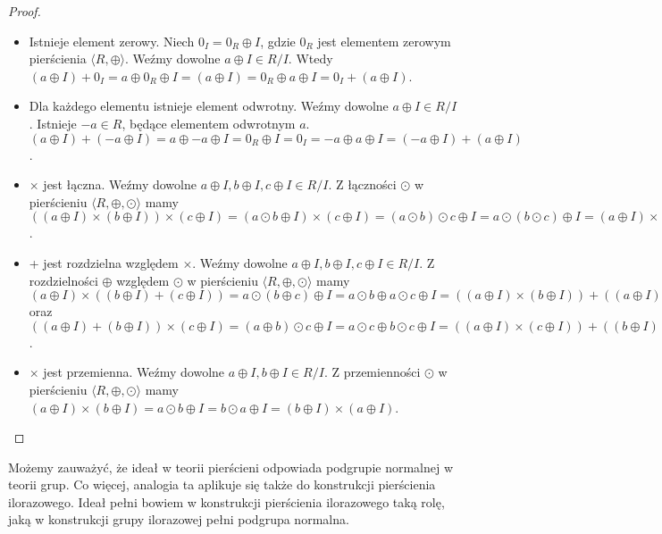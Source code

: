 \documentclass[declaration,shortabstract]{iithesis}
\theoremstyle{definition}
\theoremstyle{remark} \newtheorem{observation}{Obserwacja}
\theoremstyle{plain} \newtheorem{theorem}{Twierdzenie}
\theoremstyle{plain} \newtheorem{lemma}{Lemat}
\theoremstyle{remark} \newtheorem*{remark*}{Uwaga}
\theoremstyle{reminder} \newtheorem*{reminder*}{Przypomnienie}
\begin{document}
\begin{proof}
\begin{enumerate}[label=Ad.\arabic*.,leftmargin=.4in]
\begin{itemize}
		      	\item Istnieje element zerowy. Niech $0_I = 0_R \oplus I$, gdzie $0_R$ jest elementem zerowym pierścienia $\langle R, \oplus \rangle$. Weźmy dowolne $a \oplus I \in R/I$. Wtedy $(a \oplus I) + 0_I = a \oplus 0_R \oplus I = (a \oplus I) = 0_R \oplus a \oplus I = 0_I + (a \oplus I)$.
		      	\item Dla każdego elementu istnieje element odwrotny. Weźmy dowolne $a \oplus I \in R/I$. Istnieje $-a \in R$, będące elementem odwrotnym $a$. $(a \oplus I) + (-a \oplus I) = a \oplus -a \oplus I = 0_R \oplus I = 0_I = -a \oplus a \oplus I = (-a \oplus I) + (a \oplus I)$.
		      	\item $\times$ jest łączna. Weźmy dowolne $a \oplus I, b \oplus I, c \oplus I \in R/I$. Z łączności $\odot$ w pierścieniu $\langle R, \oplus, \odot \rangle$ mamy $((a \oplus I) \times (b \oplus I)) \times (c \oplus I) = (a \odot b \oplus I) \times (c \oplus I) = (a \odot b) \odot c \oplus I = a \odot (b \odot c) \oplus I = (a \oplus I) \times (b \odot c \oplus I) = (a \oplus I) \times ((b \oplus I) \times (c \oplus I))$.
		      	\item + jest rozdzielna względem $\times$. Weźmy dowolne $a \oplus I, b \oplus I, c \oplus I \in R/I$. Z rozdzielności $\oplus$ względem $\odot$ w pierścieniu $\langle R, \oplus, \odot \rangle$ mamy $(a \oplus I) \times ((b \oplus I) + (c \oplus I)) = a \odot (b \oplus c) \oplus I = a \odot b \oplus a \odot c \oplus I = ((a \oplus I) \times (b \oplus I)) + ((a \oplus I) \times (c \oplus I))$ oraz $((a \oplus I) + (b \oplus I)) \times (c \oplus I) = (a \oplus b) \odot c \oplus I = a \odot c \oplus b \odot c \oplus I = ((a \oplus I) \times (c \oplus I)) + ((b \oplus I) \times (c \oplus I))$.
		      	\item $\times$ jest przemienna. Weźmy dowolne $a \oplus I, b \oplus I \in R/I$. Z przemienności $\odot$ w pierścieniu $\langle R, \oplus, \odot \rangle$ mamy $(a \oplus I) \times (b \oplus I) = a \odot b \oplus I = b \odot a \oplus I = (b \oplus I) \times (a \oplus I)$.
		      \end{itemize}
	\end{enumerate}
\end{proof}

Możemy zauważyć, że ideał w teorii pierścieni odpowiada podgrupie normalnej w teorii grup. Co więcej, analogia ta aplikuje się także do konstrukcji pierścienia ilorazowego. Ideał pełni bowiem w konstrukcji pierścienia ilorazowego taką rolę, jaką w konstrukcji grupy ilorazowej pełni podgrupa normalna.
\end{document}

